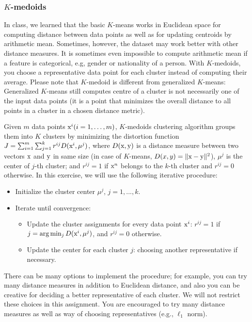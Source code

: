 \documentclass[twoside,10pt]{article}
\begin{document}
\subsubsection*{$K$-medoids}

In class, we learned that the basic $K$-means works in Euclidean space for computing distance between data points as well as for updating centroids by arithmetic mean. Sometimes, however, the dataset may work better with other distance measures. It is sometimes even impossible to compute arithmetic mean if a feature is categorical, e.g, gender or nationality of a person. With $K$-medoids, you choose a representative data point for each cluster instead of computing their average. Please note that $K$-medoid is different from generalized $K$-means: Generalized $K$-means still computes centre of a cluster is not necessarily one of the input data points (it is a point that minimizes the overall distance to all points in a cluster in a chosen distance metric). 

Given $m$ data points $\text x^i (i = 1, \ldots, m)$, $K$-medoids clustering algorithm groups them into $K$ clusters by minimizing the distortion function $J = \sum_{i=1}^m \sum_{j=1}^k r^{ij} D(\text x^i, \mu^j)$,
where $D(\text x, \text y)$ is a distance measure between two vectors $\text x$ and $\text y$ in same size (in case of $K$-means, $D(x, y) = \| \text x - \text y \|^2$), $\mu^j$ is the center of $j$-th cluster; and $r^{ij} = 1$ if $\text x^n$ belongs to the $k$-th cluster and $r^{ij} = 0$ otherwise. In this exercise, we will use the following iterative procedure:

\begin{itemize}
  \item Initialize the cluster center $\mu^j$, $j = 1, ..., k$.
  \item Iterate until convergence:
  \begin{itemize}
    \item Update the cluster assignments for every data point $\text x^i$: $r^{ij} = 1$ if $j = \arg\min_j D(\text x^i, \mu^j)$, and $r^{ij} = 0$ otherwise.
    \item Update the center for each cluster $j$: choosing another representative if necessary.
  \end{itemize}
\end{itemize}

There can be many options to implement the procedure; for example, you can try many distance measures in addition to Euclidean distance, and also you can be creative for deciding a better representative of each cluster. We will not restrict these choices in this assignment. You are encouraged to try many distance measures as well as way of choosing representatives (e.g., $\ell_1$ norm).
\end{document}
